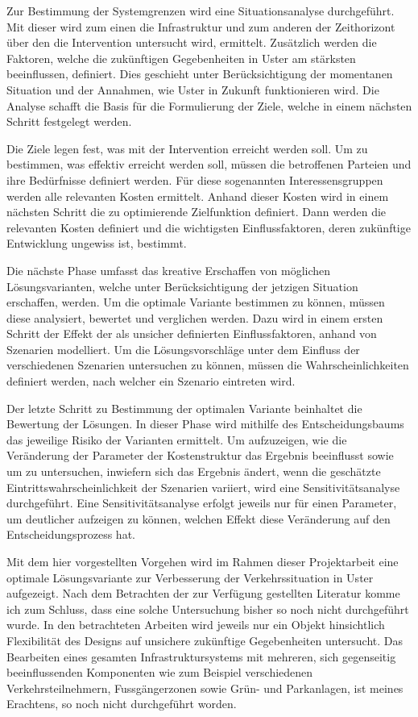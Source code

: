 \begin{IMleftrightskip}
Zur Bestimmung der Systemgrenzen wird eine Situationsanalyse durchgeführt. Mit dieser wird zum einen die Infrastruktur und zum anderen der Zeithorizont über den die Intervention untersucht wird, ermittelt. Zusätzlich werden die Faktoren, welche die zukünftigen Gegebenheiten in Uster am stärksten beeinflussen, definiert. Dies geschieht unter Berücksichtigung der momentanen Situation und der Annahmen, wie Uster in Zukunft funktionieren wird. Die Analyse schafft die Basis für die Formulierung der Ziele, welche in einem nächsten Schritt festgelegt werden.

Die Ziele legen fest, was mit der Intervention erreicht werden soll. Um zu bestimmen, was effektiv erreicht werden soll, müssen die betroffenen Parteien und ihre Bedürfnisse definiert werden. Für diese sogenannten Interessensgruppen werden alle relevanten Kosten ermittelt. Anhand dieser Kosten wird in einem nächsten Schritt die zu optimierende Zielfunktion definiert. Dann werden die relevanten Kosten definiert und die wichtigsten Einflussfaktoren, deren zukünftige Entwicklung ungewiss ist, bestimmt. 

Die nächste Phase umfasst das kreative Erschaffen von möglichen Lösungsvarianten, welche unter Berücksichtigung der jetzigen Situation erschaffen, werden. Um die optimale Variante bestimmen zu können, müssen diese analysiert, bewertet und verglichen werden. Dazu wird in einem ersten Schritt der Effekt der als unsicher definierten Einflussfaktoren, anhand von Szenarien modelliert. Um die Lösungsvorschläge unter dem Einfluss der verschiedenen Szenarien untersuchen zu können, müssen die Wahrscheinlichkeiten definiert werden, nach welcher ein Szenario eintreten wird. 

Der letzte Schritt zu Bestimmung der optimalen Variante beinhaltet die Bewertung der Lösungen. In dieser Phase wird mithilfe des Entscheidungsbaums das jeweilige Risiko der Varianten ermittelt. Um aufzuzeigen, wie die Veränderung der Parameter der Kostenstruktur das Ergebnis beeinflusst sowie um zu untersuchen, inwiefern sich das Ergebnis ändert, wenn die geschätzte Eintrittswahrscheinlichkeit der Szenarien variiert, wird eine Sensitivitätsanalyse durchgeführt. Eine Sensitivitätsanalyse erfolgt jeweils nur für einen Parameter, um deutlicher aufzeigen zu können, welchen Effekt diese Veränderung auf den Entscheidungsprozess hat. 
\end{IMleftrightskip}

Mit dem hier vorgestellten Vorgehen wird im Rahmen dieser Projektarbeit eine optimale Lösungsvariante zur Verbesserung der Verkehrssituation in Uster aufgezeigt. Nach dem Betrachten der zur Verfügung gestellten Literatur komme ich zum Schluss, dass eine solche Untersuchung bisher so noch nicht durchgeführt wurde. In den betrachteten Arbeiten wird jeweils nur ein Objekt hinsichtlich Flexibilität des Designs auf unsichere zukünftige Gegebenheiten untersucht. Das Bearbeiten eines gesamten Infrastruktursystems mit mehreren, sich gegenseitig beeinflussenden Komponenten wie zum Beispiel verschiedenen Verkehrsteilnehmern, Fussgängerzonen sowie Grün- und Parkanlagen, ist meines Erachtens, so noch nicht durchgeführt worden.

%


